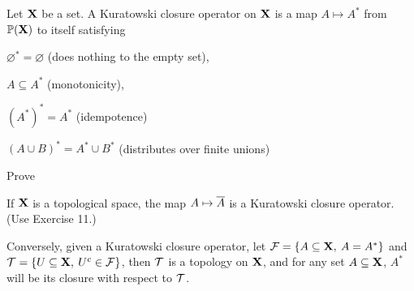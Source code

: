 \documentclass[../../main.tex]{subfiles}
\begin{document}
\begin{wts}
    Let ${\mathbf{X}}$ be a set. A Kuratowski closure operator on ${\mathbf{X}}$ is a map $A\mapsto A^*$ from $\mathbb{P}({{\mathbf{X}}})$ to itself satisfying
    \begin{enumroman}
        \item $\varnothing^* = \varnothing$ (does nothing to the empty set),
        \item $A\subseteq A^*$ (monotonicity),
        \item $(A^*)^* = A^*$ (idempotence)
        \item $(A\cup B)^* = A^* \cup B^*$ (distributes over finite unions)
    \end{enumroman}
    Prove
    \begin{enumalpha}
        \item If ${\mathbf{X}}$ is a topological space, the map $A\mapsto \overline{A}$ is a Kuratowski closure operator. (Use Exercise 11.)
        \item Conversely, given a Kuratowski closure operator, let $\mathcal{F} = \{ A\subseteq {\mathbf{X}},\: A = A^*\}$ and $\mathcal{T} = \{U\subseteq {\mathbf{X}},\: U^c\in \mathcal{F}\}$, then $\mathcal{T}$ is a topology on ${\mathbf{X}}$, and for any set $A\subseteq{\mathbf{X}}$, $A^*$ will be its closure with respect to $\mathcal{T}$.
    \end{enumalpha}
\end{wts}
\end{document}
